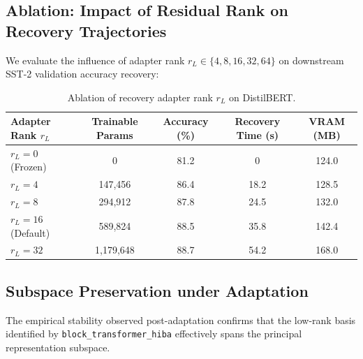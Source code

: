 \subsection{Ablation: Impact of Residual Rank on Recovery Trajectories}
We evaluate the influence of adapter rank $r_L \in \{4, 8, 16, 32, 64\}$ on downstream SST-2 validation accuracy recovery:
\begin{table}[H]
\centering
\small
\begin{tabularx}{\linewidth}{lcccc}
\toprule
\textbf{Adapter Rank $r_L$} & \textbf{Trainable Params} & \textbf{Accuracy (\%)} & \textbf{Recovery Time (s)} & \textbf{VRAM (MB)} \\
\midrule
$r_L = 0$ (Frozen) & 0 & 81.2 & 0 & 124.0 \\
$r_L = 4$ & 147,456 & 86.4 & 18.2 & 128.5 \\
$r_L = 8$ & 294,912 & 87.8 & 24.5 & 132.0 \\
$r_L = 16$ (Default) & 589,824 & 88.5 & 35.8 & 142.4 \\
$r_L = 32$ & 1,179,648 & 88.7 & 54.2 & 168.0 \\
\bottomrule
\end{tabularx}
\caption{Ablation of recovery adapter rank $r_L$ on DistilBERT.}
\label{tab:ablation_adapter_rank}
\end{table}

\subsection{Subspace Preservation under Adaptation}
The empirical stability observed post-adaptation confirms that the low-rank basis identified by \texttt{block\_transformer\_hiba} effectively spans the principal representation subspace.
